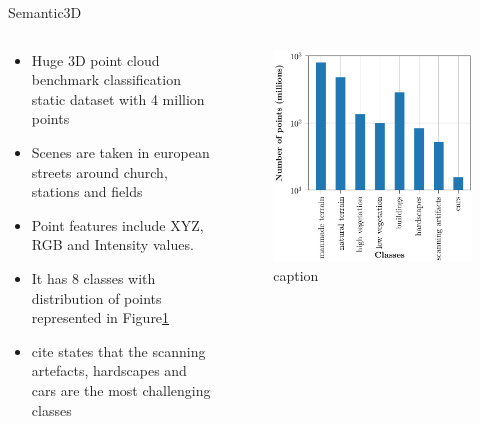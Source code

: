 \documentclass[aspectratio=169]{beamer}
\begin{document}
\begin{frame}{Semantic3D}
    \begin{columns}
        \begin{column}{0.5\textwidth}
            \begin{itemize}
                \item Huge 3D point cloud benchmark classification static dataset with 4 million points
                \item Scenes are taken in european streets around church, stations and fields
                \item Point features include XYZ, RGB and Intensity values.
                \item It has 8 classes with distribution of points represented in Figure\ref{fig:sem3d_stats}
                \item cite states that the scanning artefacts, hardscapes and cars are the most challenging classes
            \end{itemize}
        \end{column}
        \begin{column}{0.5\textwidth}
            \begin{figure}
                \centering
                \includegraphics[scale=0.25]{images/sem3d/sem3d_stats.jpg}
                \caption{caption}
                \label{fig:sem3d_stats}
            \end{figure}
        \end{column}
    \end{columns}
\end{frame}
\end{document}

